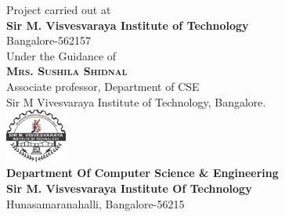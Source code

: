 \begin{titlepage}
	\Large{Project carried out at\\
		\textbf{Sir M. Visvesvaraya Institute of Technology}
		\\Bangalore-562157
	}\\[10pt]
	\Large{Under the Guidance of\\
		\textbf{\textsc{\Large Mrs. Sushila Shidnal }}\\
		Associate professor, Department of CSE\\
		Sir M Vivesvaraya Institute of Technology, Bangalore.
	}\\[10pt]
	\includegraphics[width=0.15\textwidth]{images/mvit.png}\\[10pt] 
	\Large{
		\textbf{Department Of Computer Science \& Engineering}\\
		\textbf{Sir M. Visvesvaraya Institute Of Technology}\\
		Hunasamaranahalli, Bangalore-56215\\
	}

\end{titlepage}

